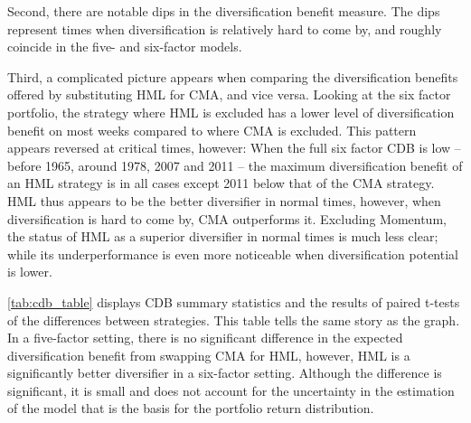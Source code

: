 Second, there are notable dips in the diversification benefit measure. The dips represent times when diversification is relatively hard to come by, and roughly coincide in the five- and six-factor models.

Third, a complicated picture appears when comparing the diversification benefits offered by substituting HML for CMA, and vice versa. Looking at the six factor portfolio, the strategy where HML is excluded has a lower level of diversification benefit on most weeks compared to where CMA is excluded. This pattern appears reversed at critical times, however: When the full six factor CDB is low -- before 1965, around 1978, 2007 and 2011 -- the maximum diversification benefit of an HML strategy is in all cases except 2011 below that of the CMA strategy. HML thus appears to be the better diversifier in normal times, however, when diversification is hard to come by, CMA outperforms it. Excluding Momentum, the status of HML as a superior diversifier in normal times is much less clear; while its underperformance is even more noticeable when diversification potential is lower.

\autoref{tab:cdb_table} displays CDB summary statistics and the results of paired t-tests of the differences between strategies. This table tells the same story as the graph. In a five-factor setting, there is no significant difference in the expected diversification benefit from swapping CMA for HML, however, HML is a significantly better diversifier in a six-factor setting. Although the difference is significant, it is small and does not account for the uncertainty in the estimation of the model that is the basis for the portfolio return distribution.





